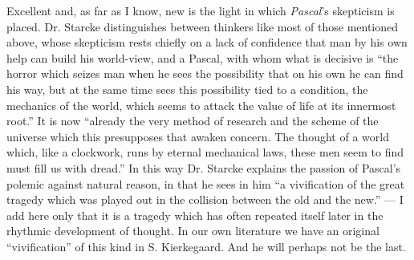 \documentclass[12pt,a4paper,openany]{book}
\newcommand{\opage}[1]{\marginnote{\footnotesize\textit{[#1]}}}
\begin{document}
Excellent and, as far as I know, new is the light in which
\emph{Pascal}'s skepticism is placed. Dr. Starcke distinguishes
between thinkers like most of those mentioned above, whose skepticism
rests chiefly on a lack of confidence that man
by his own help can build his world-view, and a
\opage{23}Pascal, with whom what is decisive is ``the horror which seizes
man when he sees the possibility that on his own
he can find his way, but at the same time sees this
possibility tied to a condition, the mechanics of the world, which
seems to attack the value of life at its innermost root.'' It
is now ``already the very method of research and the scheme
of the universe which this presupposes that awaken concern.
The thought of a world which, like a clockwork, runs by
eternal mechanical laws, these men seem to find must
fill us with dread.'' In this way Dr. Starcke explains
the passion of Pascal's polemic against natural
reason, in that he sees in him ``a vivification of the great
tragedy which was played out in the collision between the old
and the new.'' --- I add here only that it is a tragedy
which has often repeated itself later in the rhythmic
development of thought. In our own literature we have an original
``vivification'' of this kind in S. Kierkegaard. And he will
perhaps not be the last.
\end{document}
